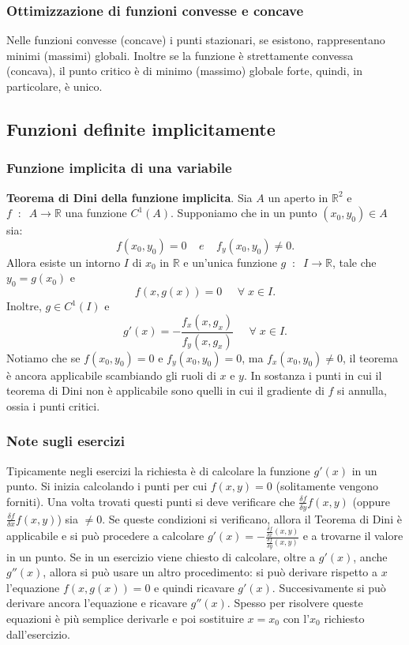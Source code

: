 \subsubsection{Ottimizzazione di funzioni convesse e concave}
Nelle funzioni convesse (concave) i punti stazionari, se esistono, rappresentano minimi (massimi) globali. Inoltre se la funzione è strettamente convessa (concava), il punto critico è di minimo (massimo) globale forte, quindi, in particolare, è unico.
\subsection{Funzioni definite implicitamente}
\subsubsection{Funzione implicita di una variabile}
\textbf{Teorema di Dini della funzione implicita}. Sia $A$ un aperto in $\mathbb{R}^2$ e $f \;\;:\;\; A \rightarrow \mathbb{R}$ una funzione $C^1(A)$. Supponiamo che in un punto $(x_0,y_0) \in A$ sia:
\[
    f(x_0,y_0)= 0 \;\;\;\; e \;\;\;\; f_y(x_0,y_0) \neq 0.
\] 
Allora esiste un intorno $I$ di $x_0$ in $\mathbb{R}$ e un'unica funzione $g \;\;:\;\; I \rightarrow \mathbb{R}$, tale che $y_0=g(x_0)$ e
\[
    f(x,g(x)) = 0 \;\;\;\; \;\forall\;x \in I.
\]
Inoltre, $g \in C^1(I)$ e 
\[
    g'(x) = - \frac{f_x(x,g_x)}{f_y(x,g_x)} \;\;\;\; \;\forall\;x \in I.
\]
Notiamo che se $f(x_0,y_0) = 0$ e $f_y(x_0, y_0) = 0$, ma $f_x(x_0, y_0) \neq 0$, il teorema è ancora applicabile scambiando gli ruoli di $x$ e $y$.\newline
In sostanza i punti in cui il teorema di Dini non è applicabile sono quelli in cui il gradiente di $f$ si annulla, ossia i punti critici.
\subsubsection{Note sugli esercizi}
Tipicamente negli esercizi la richiesta è di calcolare la funzione $g'(x)$ in un punto. Si inizia calcolando i punti per cui $f(x,y) = 0$ (solitamente vengono forniti). Una volta trovati questi punti si deve verificare che $\frac{\delta f}{\delta y} f(x,y)$ (oppure $\frac{\delta f}{\delta x} f(x,y)$) sia $\neq 0$. Se queste condizioni si verificano, allora il Teorema di Dini è applicabile e si può procedere a calcolare $g'(x) = - \frac{\frac{\delta f}{\delta x}(x,y)}{\frac{\delta f}{\delta y} (x,y)}$ e a trovarne il valore in un punto.\newline
\newline
Se in un esercizio viene chiesto di calcolare, oltre a $g'(x)$, anche $g''(x)$, allora si può usare un altro procedimento: si può derivare rispetto a $x$ l'equazione $f(x, g(x)) = 0$ e quindi ricavare $g'(x)$. Succesivamente si può derivare ancora l'equazione e ricavare $g''(x)$. Spesso per risolvere queste equazioni è più semplice derivarle e poi sostituire $x = x_0$ con l'$x_0$ richiesto dall'esercizio.
